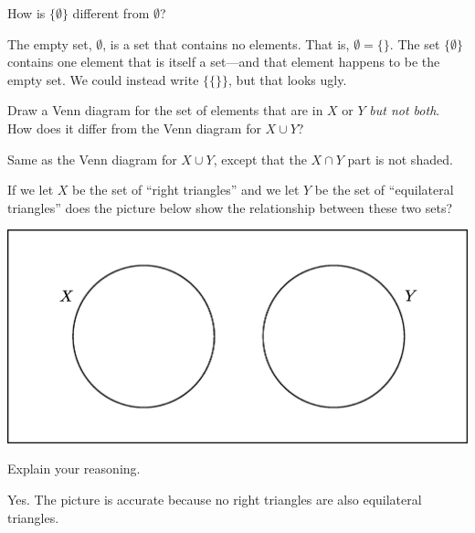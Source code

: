 \documentclass[nooutcomes]{ximera}
\begin{document}
\begin{problem}
How is $\{\emptyset\}$ different from $\emptyset$?  
\begin{freeResponse}
\begin{hint}
The empty set, $\emptyset$, is a set that contains no elements.  That is, $\emptyset = \{\}$.  The set $\{\emptyset\}$ contains one element that is itself a set---and that element happens to be the empty set.  We could instead write $\{\{\}\}$, but that looks ugly.
\end{hint}
\end{freeResponse}
\end{problem}

\begin{problem}
Draw a Venn diagram for the set of elements that are in $X$ or $Y$ \emph{but not both}. 
How does it differ from the Venn diagram for $X\cup Y$?  
\begin{freeResponse}
\begin{hint}
Same as the Venn diagram for $X\cup Y$, except that the $X\cap Y$ part is not shaded.  
\end{hint}
\end{freeResponse}
\end{problem}

\begin{problem}
If we let $X$ be the set of ``right triangles'' and we let $Y$ be the set of ``equilateral triangles'' does the picture below show the relationship between these two sets?
\begin{image}
  \includegraphics{set4.png}
\end{image}
\begin{multipleChoice}
\end{multipleChoice}

Explain your reasoning.
\begin{freeResponse}
\begin{hint}
Yes.  The picture is accurate because no right triangles are also equilateral triangles.  
\end{hint}
\end{freeResponse}
\end{problem}
\end{document}
